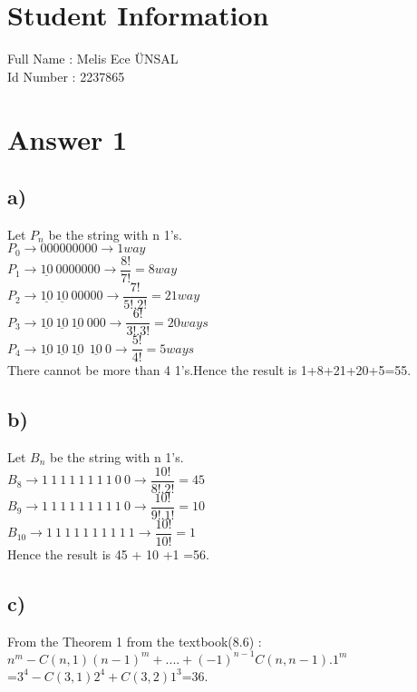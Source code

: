 \documentclass[12pt]{article}
\begin{document}
	
	\section*{Student Information } 
	Full Name : Melis Ece ÜNSAL \\
	Id Number :  2237865\\
	
	\section*{Answer 1}
	\subsection*{a)} Let $P_n$ be the string with  n 1's.\\
	$P_0 \rightarrow 0 0 0 0 0 0 0 0 0 \rightarrow 1 way$\\
	$P_1 \rightarrow \underline{1 0} \ 0 0 0 0 0 0 0 \rightarrow \dfrac{8!}{7!}=8 way$\\
	$P_2 \rightarrow \underline{1 0} \ \underline{1 0} \ 0 0 0 0 0 \rightarrow \dfrac{7!}{5!.2!}=21 way$\\
	$P_3 \rightarrow \underline{1 0} \ \underline{1 0} \  \underline{1 0} \ 0 0 0 \rightarrow \dfrac{6!}{3!.3!}=20 ways$\\
	$P_4 \rightarrow \underline{1 0} \ \underline{1 0} \  \underline{1 0} \ \  \underline{1 0} \ 0 \rightarrow \dfrac{5!}{4!}=5 ways$\\
	There cannot be more than 4 1's.Hence the result is 1+8+21+20+5=55.
	\subsection*{b)}
	Let $B_n$ be the string with  n 1's.\\
	$B_8 \rightarrow 1 \ 1 \ 1 \ 1 \ 1 \ 1 \ 1 \ 1 \ 0 \ 0 \rightarrow \dfrac{10!}{8!.2!} =45 $\\
	$B_9 \rightarrow 1 \ 1 \ 1 \ 1 \ 1 \ 1 \ 1 \ 1 \ 1 \ 0 \rightarrow \dfrac{10!}{9!.1!} =10 $\\
	$B_10 \rightarrow 1 \ 1 \ 1 \ 1 \ 1 \ 1 \ 1 \ 1 \ 1 \ 1 \rightarrow \dfrac{10!}{10!} =1 $\\
	Hence the result is 45 + 10 +1 =56.
	\subsection*{c)}
	From the Theorem 1 from the textbook(8.6) :\\ $n^m -C(n,1)(n-1)^m+....+(-1)^{n-1}C(n,n-1).1^m$\\
	=$3^4-C(3,1)2^4+C(3,2)1^3$=36.
\end{document}
